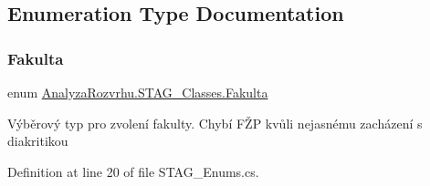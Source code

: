 \subsection{Enumeration Type Documentation}
\mbox{\label{namespace_analyza_rozvrhu_1_1_s_t_a_g___classes_a2e3181499083134e3da66098b571fb83}} 
\subsubsection{\texorpdfstring{Fakulta}{Fakulta}}
{\footnotesize\ttfamily enum \hyperlink{namespace_analyza_rozvrhu_1_1_s_t_a_g___classes_a2e3181499083134e3da66098b571fb83}{Analyza\+Rozvrhu.\+S\+T\+A\+G\+\_\+\+Classes.\+Fakulta}\hspace{0.3cm}{\ttfamily [strong]}}



Výběrový typ pro zvolení fakulty. Chybí FŽP kvůli nejasnému zacházení s diakritikou 



Definition at line 20 of file S\+T\+A\+G\+\_\+\+Enums.\+cs.

